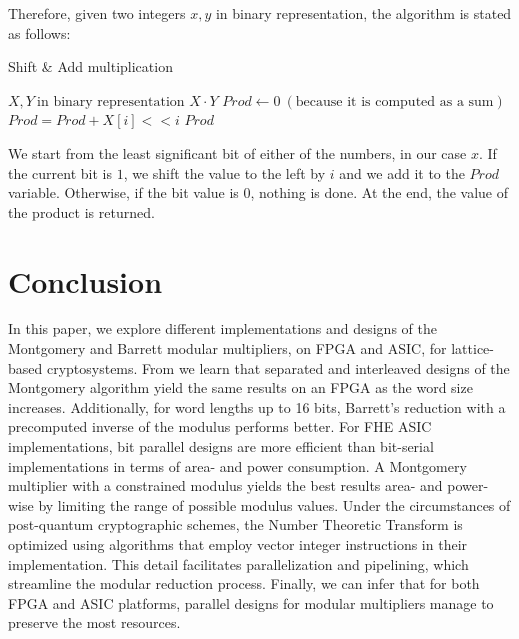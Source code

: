 \documentclass[11pt,
  titlepage=false,
  abstract=on,
]{scrreprt}
\begin{document}
Therefore, given two integers $x, y$ in binary representation, the algorithm is stated as follows:

\begin{algorithm}
  \caption{Shift \& Add multiplication}
  \label{alg:montgomery}
  \begin{algorithmic}[1]
  \REQUIRE \( X, Y\ \text{in binary representation}\)
  \renewcommand{\algorithmicensure}{\textbf{Output:}}
  \ENSURE \(X \cdot Y\)
  \STATE \( Prod \leftarrow 0\ (\text{because it is computed as a sum}) \)
          \STATE \( Prod = Prod + X[i] << i \)
      \ENDIF
  \ENDFOR
  \RETURN \( Prod \)
  \end{algorithmic}
\end{algorithm}

We start from the least significant bit of either of the numbers, in our case $x$. If the current bit is $1$, we shift the value to the left by $i$ and
we add it to the $Prod$ variable. Otherwise, if the bit value is 0, nothing is done. At the end, the value of the product is returned.
\section{Conclusion}
\label{sec:conclusion}
In this paper, we explore different implementations and designs of the Montgomery and Barrett modular multipliers, on FPGA and ASIC, for lattice-based cryptosystems.
From \cite{kong2006comparison} we learn that separated and interleaved designs of the Montgomery algorithm yield the same results on an FPGA as the word size increases.
Additionally, for word lengths up to 16 bits, Barrett's reduction with a precomputed inverse of the modulus performs better. 
For FHE ASIC implementations, bit parallel designs are more efficient than bit-serial implementations in terms of area- and power consumption. A Montgomery multiplier 
with a constrained modulus yields the best results area- and power-wise by limiting the range of possible modulus values.
Under the circumstances of post-quantum cryptographic schemes, the Number Theoretic Transform is optimized using algorithms that employ vector integer instructions in
their implementation. This detail facilitates parallelization and pipelining, which streamline the modular reduction process.
Finally, we can infer that for both FPGA and ASIC platforms, parallel designs for modular multipliers manage to preserve the most resources.
\end{document}
